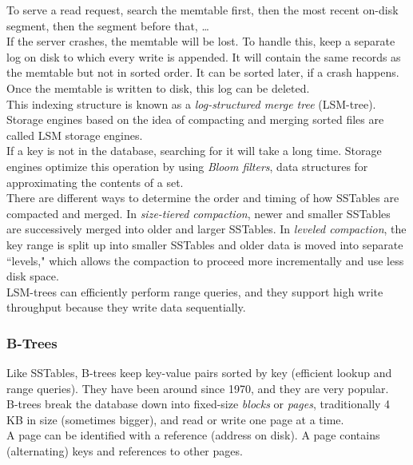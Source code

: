 \documentclass[12pt, titlepage]{article}
\begin{document}
To serve a read request, search the memtable first, then the most recent on-disk segment, then the segment before that, \dots \\

If the server crashes, the memtable will be lost. To handle this, keep a separate log on disk to which every write is appended. It will contain the same records as the memtable but not in sorted order. It can be sorted later, if a crash happens. Once the memtable is written to disk, this log can be deleted. \\

This indexing structure is known as a \textit{log-structured merge tree} (LSM-tree). Storage engines based on the idea of compacting and merging sorted files are called LSM storage engines. \\

If a key is not in the database, searching for it will take a long time. Storage engines optimize this operation by using \textit{Bloom filters}, data structures for approximating the contents of a set. \\

There are different ways to determine the order and timing of how SSTables are compacted and merged. In \textit{size-tiered compaction}, newer and smaller SSTables are successively merged into older and larger SSTables. In \textit{leveled compaction}, the key range is split up into smaller SSTables and older data is moved into separate ``levels," which allows the compaction to proceed more incrementally and use less disk space. \\

LSM-trees can efficiently perform range queries, and they support high write throughput because they write data sequentially.

\subsubsection{B-Trees}

Like SSTables, B-trees keep key-value pairs sorted by key (efficient lookup and range queries). They have been around since 1970, and they are very popular. \\

B-trees break the database down into fixed-size \textit{blocks} or \textit{pages}, traditionally 4 KB in size (sometimes bigger), and read or write one page at a time. \\

A page can be identified with a reference (address on disk). A page contains (alternating) keys and references to other pages. \\
\end{document}
